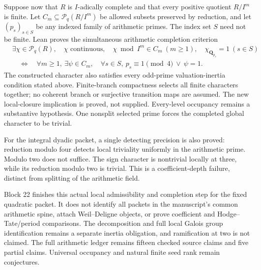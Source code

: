 \documentclass[11pt]{article}
\theoremstyle{definition}
\theoremstyle{remark}
\newcommand{\Q}{\mathbf Q}
\begin{document}
Suppose now that $R$ is $I$-adically complete and that every positive
quotient $R/I^m$ is finite. Let $C_m\subseteq\mathcal P_q(R/I^m)$ be
allowed subsets preserved by reduction, and let $(p_s)_{s\in S}$ be any
indexed family of arithmetic primes. The index set $S$ need not be finite.
Lean proves the simultaneous arithmetic completion criterion
\[
\begin{split}
&\exists\chi\in\mathcal P_q(R),\quad
 \chi\text{ continuous},\quad
 \chi\bmod I^m\in C_m\ (m\ge1),\quad
 \chi_{\Q_{p_s}}=1\ (s\in S)\\
&\quad\Longleftrightarrow\quad
 \forall m\ge1,\ \exists\psi\in C_m,\quad
 \forall s\in S,\ p_s\equiv1\pmod4\ \lor\ \psi=1.
\end{split}
\]
The constructed character also satisfies every odd-prime valuation-inertia
condition stated above. Finite-branch compactness selects all finite
characters together; no coherent branch or surjective transition maps
are assumed. The new local-closure implication is proved, not supplied.
Every-level occupancy remains a substantive hypothesis. One nonsplit
selected prime forces the completed global character to be trivial.

For the integral dyadic packet, a single detecting precision is also
proved: reduction modulo four detects local triviality uniformly in the
arithmetic prime. Modulo two does not suffice. The sign character is
nontrivial locally at three, while its reduction modulo two is trivial.
This is a coefficient-depth failure, distinct from splitting of the
arithmetic field.

Block 22 finishes this actual local admissibility and completion step for
the fixed quadratic packet. It does not identify all packets in the
manuscript's common arithmetic spine, attach Weil--Deligne objects, or
prove coefficient and Hodge--Tate/period comparisons. The decomposition
and full local Galois group identification remains a separate inertia
obligation, and ramification at two is not claimed. The full arithmetic
ledger remains fifteen checked source claims and five partial claims.
Universal occupancy and natural finite seed rank remain conjectures.
\end{document}
